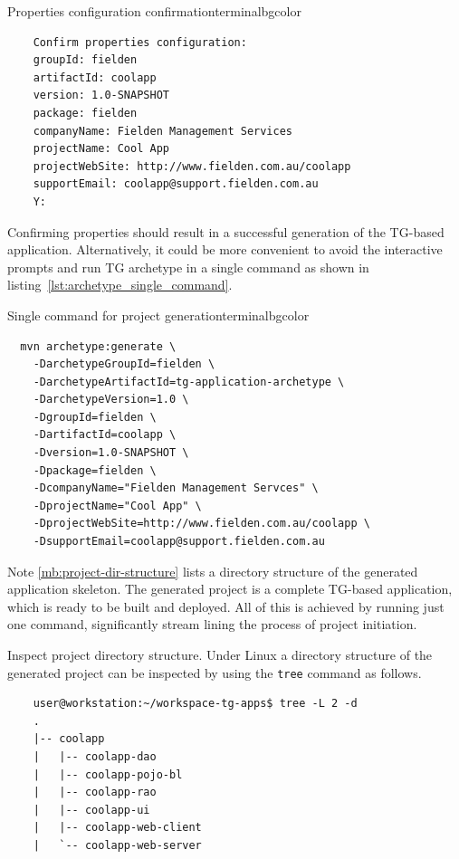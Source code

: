   
  \begin{code}{Properties configuration confirmation}{\label{lst:properties_confirmation}}{terminalbgcolor}
      \begin{lstlisting}
	Confirm properties configuration:
	groupId: fielden
	artifactId: coolapp
	version: 1.0-SNAPSHOT
	package: fielden
	companyName: Fielden Management Services
	projectName: Cool App
	projectWebSite: http://www.fielden.com.au/coolapp
	supportEmail: coolapp@support.fielden.com.au
	Y:
      \end{lstlisting}
  \end{code}

  Confirming properties should result in a successful generation of the TG-based application.
  Alternatively, it could be more convenient to avoid the interactive prompts and run TG archetype in a single command as shown in listing~\ref{lst:archetype_single_command}.

  \begin{code}{Single command for project generation}{\label{lst:archetype_single_command}}{terminalbgcolor}
      \begin{lstlisting}
  mvn archetype:generate \
	-DarchetypeGroupId=fielden \
	-DarchetypeArtifactId=tg-application-archetype \
	-DarchetypeVersion=1.0 \
	-DgroupId=fielden \
	-DartifactId=coolapp \
	-Dversion=1.0-SNAPSHOT \
	-Dpackage=fielden \
	-DcompanyName="Fielden Management Servces" \
	-DprojectName="Cool App" \
	-DprojectWebSite=http://www.fielden.com.au/coolapp \
	-DsupportEmail=coolapp@support.fielden.com.au
      \end{lstlisting}
  \end{code}

  Note \ref{mb:project-dir-structure} lists a directory structure of the generated application skeleton.
  The generated project is a complete TG-based application, which is ready to be built and deployed.
  All of this is achieved by running just one command, significantly stream lining the process of project initiation.
 
  \begin{notebox}{Inspect project directory structure.}{\label{mb:project-dir-structure}}
      Under Linux a directory structure of the generated project can be inspected by using the \texttt{tree} command as follows.
	
      \begin{verbatim}
	user@workstation:~/workspace-tg-apps$ tree -L 2 -d
	.
	|-- coolapp
	|   |-- coolapp-dao
	|   |-- coolapp-pojo-bl
	|   |-- coolapp-rao
	|   |-- coolapp-ui
	|   |-- coolapp-web-client
	|   `-- coolapp-web-server
      \end{verbatim}
  \end{notebox}

